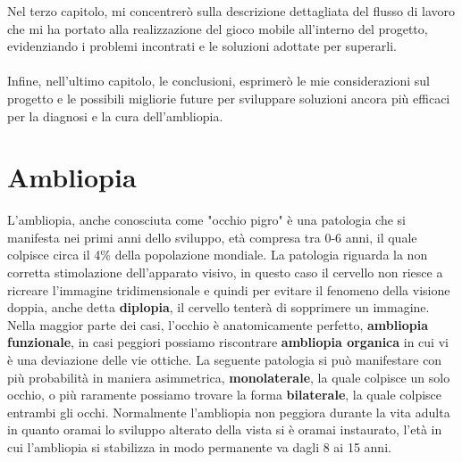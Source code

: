 \documentclass[
a4paper,
cleardoublepage=empty,
headings=twolinechapter,
numbers=autoenddot,
]{scrbook}
\begin{document}
	Nel terzo capitolo, mi concentrerò sulla descrizione dettagliata del flusso di lavoro che mi ha portato alla realizzazione del gioco mobile all'interno del progetto, evidenziando i problemi incontrati e le soluzioni adottate per superarli.\\\\
	
	Infine, nell'ultimo capitolo, le conclusioni, esprimerò le mie considerazioni sul progetto e le possibili migliorie future per sviluppare soluzioni ancora più efficaci per la diagnosi e la cura dell'ambliopia.
	
	\chapter{Ambliopia}
	L'ambliopia, anche conosciuta come "occhio pigro" è una patologia che si manifesta nei primi anni dello sviluppo, età compresa tra 0-6 anni, il quale colpisce circa il 4\% della popolazione mondiale\cite{perc_amblipia}.
	La patologia riguarda la non corretta stimolazione dell'apparato visivo, in questo caso il cervello non riesce a ricreare l'immagine tridimensionale e quindi per evitare il fenomeno della visione doppia, anche detta \textbf{diplopia}, il cervello tenterà di sopprimere un immagine.
	Nella maggior parte dei casi, l'occhio è anatomicamente perfetto, \textbf{ambliopia funzionale}, in casi peggiori possiamo riscontrare \textbf{ambliopia organica} in cui vi è una deviazione delle vie ottiche.
	La seguente patologia si può manifestare con più probabilità in maniera asimmetrica, \textbf{monolaterale}, la quale colpisce un solo occhio, o più raramente possiamo trovare la forma \textbf{bilaterale}, la quale colpisce entrambi gli occhi.
	Normalmente l'ambliopia non peggiora durante la vita adulta in quanto oramai lo sviluppo alterato della vista si è oramai instaurato, l'età in cui l'ambliopia si stabilizza in modo permanente va dagli 8 ai 15 anni.
\end{document}
